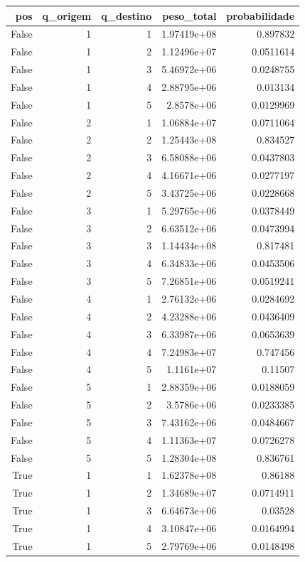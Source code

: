 \begin{tabular}{rrrrr}
\toprule
pos & q\_origem & q\_destino & peso\_total & probabilidade \\
\midrule
False & 1 & 1 & 1.97419e+08 & 0.897832 \\
False & 1 & 2 & 1.12496e+07 & 0.0511614 \\
False & 1 & 3 & 5.46972e+06 & 0.0248755 \\
False & 1 & 4 & 2.88795e+06 & 0.013134 \\
False & 1 & 5 & 2.8578e+06 & 0.0129969 \\
False & 2 & 1 & 1.06884e+07 & 0.0711064 \\
False & 2 & 2 & 1.25443e+08 & 0.834527 \\
False & 2 & 3 & 6.58088e+06 & 0.0437803 \\
False & 2 & 4 & 4.16671e+06 & 0.0277197 \\
False & 2 & 5 & 3.43725e+06 & 0.0228668 \\
False & 3 & 1 & 5.29765e+06 & 0.0378449 \\
False & 3 & 2 & 6.63512e+06 & 0.0473994 \\
False & 3 & 3 & 1.14434e+08 & 0.817481 \\
False & 3 & 4 & 6.34833e+06 & 0.0453506 \\
False & 3 & 5 & 7.26851e+06 & 0.0519241 \\
False & 4 & 1 & 2.76132e+06 & 0.0284692 \\
False & 4 & 2 & 4.23288e+06 & 0.0436409 \\
False & 4 & 3 & 6.33987e+06 & 0.0653639 \\
False & 4 & 4 & 7.24983e+07 & 0.747456 \\
False & 4 & 5 & 1.1161e+07 & 0.11507 \\
False & 5 & 1 & 2.88359e+06 & 0.0188059 \\
False & 5 & 2 & 3.5786e+06 & 0.0233385 \\
False & 5 & 3 & 7.43162e+06 & 0.0484667 \\
False & 5 & 4 & 1.11363e+07 & 0.0726278 \\
False & 5 & 5 & 1.28304e+08 & 0.836761 \\
True & 1 & 1 & 1.62378e+08 & 0.86188 \\
True & 1 & 2 & 1.34689e+07 & 0.0714911 \\
True & 1 & 3 & 6.64673e+06 & 0.03528 \\
True & 1 & 4 & 3.10847e+06 & 0.0164994 \\
True & 1 & 5 & 2.79769e+06 & 0.0148498 \\

\end{tabular}
